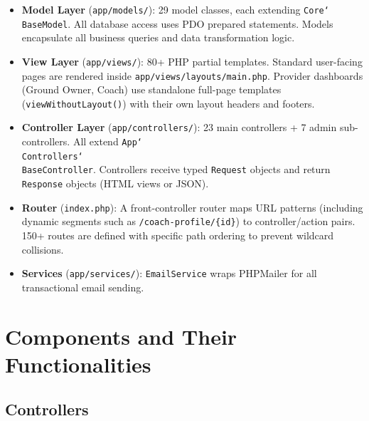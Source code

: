 \documentclass[12pt,a4paper]{report}
\begin{document}
\begin{itemize}[leftmargin=1.5cm]
  \item \textbf{Model Layer} (\texttt{app/models/}): 29 model classes, each extending \texttt{Core\char`\\BaseModel}. All database access uses PDO prepared statements. Models encapsulate all business queries and data transformation logic.
  \item \textbf{View Layer} (\texttt{app/views/}): 80+ PHP partial templates. Standard user-facing pages are rendered inside \texttt{app/views/layouts/main.php}. Provider dashboards (Ground Owner, Coach) use standalone full-page templates (\texttt{viewWithoutLayout()}) with their own layout headers and footers.
  \item \textbf{Controller Layer} (\texttt{app/controllers/}): 23 main controllers + 7 admin sub-controllers. All extend \texttt{App\char`\\Controllers\char`\\BaseController}. Controllers receive typed \texttt{Request} objects and return \texttt{Response} objects (HTML views or JSON).
  \item \textbf{Router} (\texttt{index.php}): A front-controller router maps URL patterns (including dynamic segments such as \texttt{/coach-profile/\{id\}}) to controller/action pairs. 150+ routes are defined with specific path ordering to prevent wildcard collisions.
  \item \textbf{Services} (\texttt{app/services/}): \texttt{EmailService} wraps PHPMailer for all transactional email sending.
\end{itemize}

\section{Components and Their Functionalities}

\subsection{Controllers}
\end{document}
